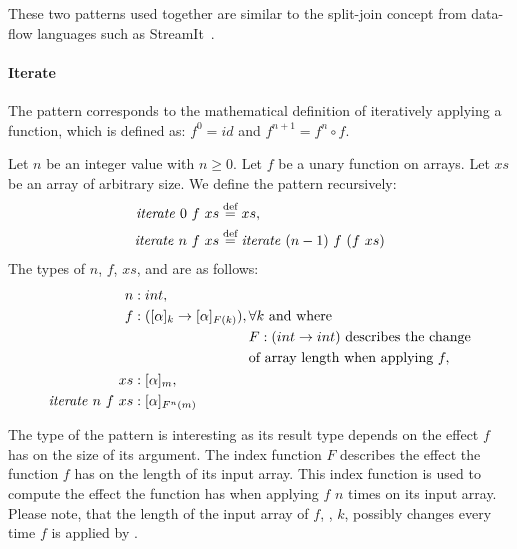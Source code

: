 These two patterns used together are similar to the split-join concept from data-flow languages such as StreamIt~\cite{ThiesKaAm2002}.


\paragraph{Iterate}
The \iterateN pattern corresponds to the mathematical definition of iteratively applying a function, which is defined as: {$f^0 = id$} and {$f^{n+1} = f^n \circ f$}.

\begin{definition}
  \label{definition:pattern:iterate}
  Let $n$ be an integer value with $n \geq 0$.
  Let $f$ be a unary function on arrays.
  Let $xs$ be an array of arbitrary size.
  We define the \iterateN pattern recursively:
  \begin{align*}
    \text{\textit{iterate}}\ 0\ f\ xs &\stackrel{\textrm{\scriptsize def}}{=} xs,\\
    \text{\textit{iterate}}\ n\ f\ xs &\stackrel{\textrm{\scriptsize def}}{=} \text{\textit{iterate}}\ (n-1)\ f\ (f\ xs)
  \end{align*}
  The types of $n$, $f$, $xs$, and \iterateN are as follows:
  \begin{align*}
    n &: int,\\
    f &: ([\alpha]_k \rightarrow [\alpha]_{F(k)}),
      \begin{aligned}[t]
        & \forall k \text{ and where } \\
        &F : (int\rightarrow int) \text{ describes the change}\\
        &\text{of array length when applying } f,
      \end{aligned}\\
    xs &: [\alpha]_m,\\
    \text{\textit{iterate}}\ n\ f\ xs &: [\alpha]_{F^n(m)}
  \end{align*}
\end{definition}


\noindent
The type of the \iterateN pattern is interesting as its result type depends on the effect $f$ has on the size of its argument.
The index function $F$ describes the effect the function $f$ has on the length of its input array.
This index function is used to compute the effect the \iterateN function has when applying $f$ $n$ times on its input array.
Please note, that the length of the input array of $f$, \ie, $k$, possibly changes every time $f$ is applied by \iterateN.

